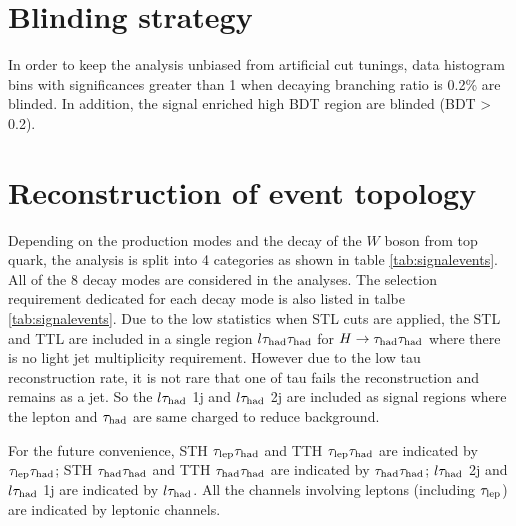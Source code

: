 \section{Blinding strategy}
\label{sec:blind}

In order to keep the analysis unbiased from artificial cut tunings, data histogram bins with significances greater than 1 when decaying branching ratio is 0.2\% are blinded. In addition, the signal enriched high BDT region are blinded (BDT > 0.2).


\section{Reconstruction of event topology}
\label{sec:reconstruction}

Depending on the production modes and the decay of the $W$ boson from top quark, the analysis is split into 4 categories as shown in table \ref{tab:signalevents}. All of the 8 decay modes are considered in the analyses. The selection requirement dedicated for each decay mode is also listed in talbe \ref{tab:signalevents}. Due to the low statistics when STL cuts are applied, the STL and TTL are included in a single region $l\tau_\text{had}{}\tau_\text{had}$ for $H\to\tau_\text{had}{}\tau_\text{had}$ where there is no light jet multiplicity requirement. However due to the low tau reconstruction rate, it is not rare that one of tau fails the reconstruction and remains as a jet. So the $l\tau_\text{had}$ 1j and $l\tau_\text{had}$ 2j are included as signal regions where the lepton and $\tau_\text{had}$ are same charged to reduce background.

For the future convenience, STH $\tau_\text{lep}{}\tau_\text{had}$ and TTH $\tau_\text{lep}{}\tau_\text{had}$ are indicated by $\tau_\text{lep}{}\tau_\text{had}$; STH $\tau_\text{had}{}\tau_\text{had}$ and TTH $\tau_\text{had}{}\tau_\text{had}$ are indicated by $\tau_\text{had}{}\tau_\text{had}$; $l\tau_\text{had}$ 2j and $l\tau_\text{had}$ 1j are indicated by $l\tau_\text{had}$. All the channels involving leptons (including $\tau_\text{lep}$) are indicated by leptonic channels.

